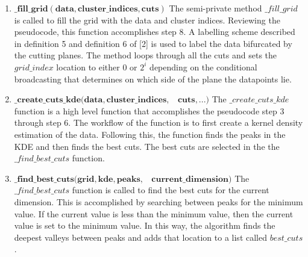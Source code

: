 \begin{enumerate}
    \item $\mathbf{\_fill\_grid(data, cluster\_indices,cuts)}$\newline
    {The semi-private method $\_fill\_grid$ is called to fill the grid with the data and cluster indices. Reviewing the pseudocode, this function accomplishes step 8. 
    A labelling scheme described in definition 5 and definition 6 of [2] is used to label the data bifurcated by the cutting planes. 
    The method loops through all the cuts and sets the $grid\_index$ location to either 0 or ${2^i}$ depending on the conditional broadcasting that determines on which side of the plane the datapoints lie.}
    \item $\mathbf{\_create\_cuts\_kde(data, cluster\_indices,}$\newline $\mathbf{~~~~cuts,  ... )}$\newline
    {The $\_create\_cuts\_kde$ function is a high level function that accomplishes the pseudocode step 3 through step 6. 
    The workflow of the function is to first create a kernel density estimation of the data. Following this, the function finds the peaks in the KDE and then finds the best cuts.
    The best cuts are selected in the the $\_find\_best\_cuts$ function.}
    \item $\mathbf{\_find\_best\_cuts(grid, kde, peaks, }$\newline $\mathbf{~~~~current\_dimension)}$\newline
    {The $\_find\_best\_cuts$ function is called to find the best cuts for the current dimension. This is accomplished by searching between peaks for the minimum value.
    If the current value is less than the minimum value, then the current value is set to the minimum value. In this way, the algorithm finds the deepest valleys between peaks and adds that location to a list called $best\_cuts$. }


\end{enumerate}
